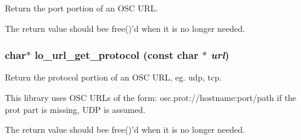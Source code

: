 Return the port portion of an OSC URL. 

The return value should bee free()'d when it is no longer needed. \hypertarget{group__liblolowlevel_g58266d3085b73fc4dc5e1913de810b22}{
\subsubsection[lo\_\-url\_\-get\_\-protocol]{\setlength{\rightskip}{0pt plus 5cm}char$\ast$ lo\_\-url\_\-get\_\-protocol (const char $\ast$ {\em url})}}
\label{group__liblolowlevel_g58266d3085b73fc4dc5e1913de810b22}


Return the protocol portion of an OSC URL, eg. udp, tcp. 

This library uses OSC URLs of the form: osc.prot://hostname:port/path if the prot part is missing, UDP is assumed.

The return value should bee free()'d when it is no longer needed. 